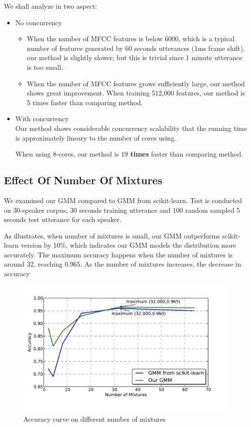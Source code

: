 We shall analyze in two aspect:
\begin{itemize}
	\item No concurrency
		\begin{itemize}
			\item When the number of MFCC features is below 6000, which is a typical
				number of features generated by 60 seconds utterances (1ms frame shift),
				our method is slightly slower; but this is trivial since
				1 minute utterance is too small.
			\item When the number of MFCC features grows sufficiently large, our method
				shows great improvement. When training 512,000 features, our method
				is 5 times faster than comparing method.
		\end{itemize}
	\item With concurrency \\
		Our method shows considerable concurrency scalability that the running time
		is approximately lineary to the number of cores using.

		When using 8-cores, our method is \textbf{$19$ times} faster than comparing
		method.
\end{itemize}


\subsection{Effect Of Number Of Mixtures}
We examined our GMM compared to GMM from scikit-learn.
Test is conducted on 30-speaker corpus, 30 seconds training utterance
and 100 random sampled 5 seconds test utterance for each speaker.

As  illustrates, when number of mixtures is small,
our GMM outperforms scikit-learn version by $10\%$, which indicates our
GMM models the distribution more accurately. The maximum accuracy
happens when the number of mixtures is around 32, reaching $0.965$. As
the number of mixtures increases, the decrease in accuracy

\begin{figure}
	\centering
	\includegraphics[width=\linewidth]{res/mixture-both.pdf}
	\caption{Accuracy curve on different number of mixtures\label{fig:mixture}}
\end{figure}

